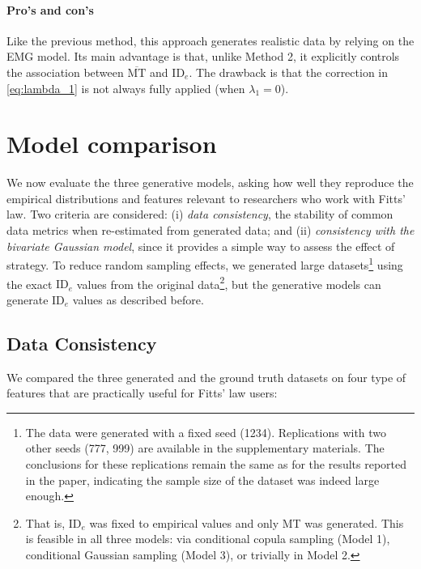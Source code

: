 \documentclass[acmlarge, manuscript,review]{acmart}
\newcommand{\mmt}{\ensuremath{\overline{\mt}}\xspace}
\newcommand{\mt}{\ensuremath{{\text{MT}}}\xspace}
\newcommand{\ide}{\ensuremath{{\text{ID}_e}}\xspace}
\begin{document}
\paragraph{Pro's and con's} 
Like the previous method, this approach generates realistic data by relying on the EMG model. Its main advantage is that, unlike Method 2, it explicitly controls the association between \mmt and \ide. The drawback is that the correction in \autoref{eq:lambda_1} is not always fully applied (\ie when $\lambda_1 = 0$).




\section{Model comparison}
We now evaluate the three generative models, asking how well they reproduce the empirical distributions and features relevant to researchers who work with Fitts' law. Two criteria are considered: (i) \textit{data consistency}, the stability of common data metrics when re-estimated from generated data; and (ii) \textit{consistency with the bivariate Gaussian model}, since it provides a simple way to assess the effect of strategy. To reduce random sampling effects, we generated large datasets\footnote{The data were generated with a fixed seed (1234). Replications with two other seeds (777, 999) are available in the supplementary materials. The conclusions for these replications remain the same as for the results reported in the paper, indicating the sample size of the dataset was indeed large enough.} using the exact \ide values from the original data\footnote{That is, \ide was fixed to empirical values and only MT was generated. This is feasible in all three models: via conditional copula sampling (Model 1), conditional Gaussian sampling (Model 3), or trivially in Model 2.}, but the generative models can generate \ide values as described before.



\subsection{Data Consistency \label{subs:consistency}}
We compared the three generated and the ground truth datasets on four type of features that are practically useful for Fitts' law users:
\end{document}
